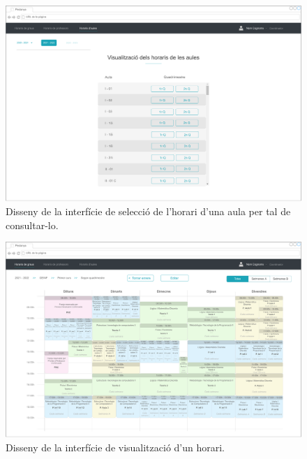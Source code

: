\documentclass[a4paper,12pt]{ThesisStyle}
\begin{document}
\begin{figure}[H]
	\centering
	\includegraphics[width=\textwidth]{assets/interfaces/coordinadors/horarisAules/main.pdf}
	\caption{\label{img:horarisAules_main}Disseny de la interfície de selecció de l'horari d'una aula per tal de consultar-lo.}
\end{figure}

\begin{figure}[H]
  \centering
  \includegraphics[width=\textwidth]{assets/interfaces/coordinadors/horarisGraus/visualitzacio.pdf}
  \caption{\label{img:horarisGraus_visualitzacio}Disseny de la interfície de visualització d'un horari.}
\end{figure}
\end{document}
